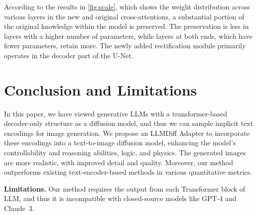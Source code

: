 According to the results in \cref{fig:scale}, which shows the weight distribution across various layers in the new and original cross-attentions, a substantial portion of the original knowledge within the model is preserved. The preservation is less in layers with a higher number of parameters, while layers at both ends, which have fewer parameters, retain more. The newly added rectification module primarily operates in the decoder part of the U-Net.

\section{Conclusion and Limitations}
In this paper, we have viewed generative LLMs with a transformer-based decoder-only structure as a diffusion model, and thus we can sample implicit text encodings for image generation. We propose an LLMDiff Adapter to incorporate these encodings into a text-to-image diffusion model, enhancing the model's controllability and reasoning abilities, logic, and physics. The generated images are more realistic, with improved detail and quality. Moreover, our method outperforms existing text-encoder-based methods in various quantitative metrics.

\noindent
\textbf{Limitations.} Our method requires the output from each Transformer block of LLM, and thus it is incompatible with closed-source models like GPT-4 and Claude~3. 